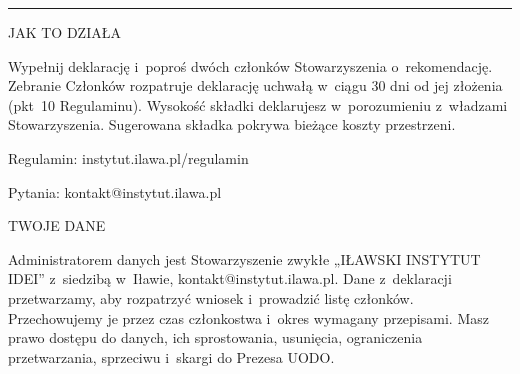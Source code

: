 \documentclass[11pt]{article}
\newcommand{\info}[1]{{\fontsize{8.5}{11}\selectfont\raggedright\color{tekstwyciszony}#1\par}}
\begin{document}
\begin{Form}
\vfill
{\color{linia}\rule{\linewidth}{0.5pt}}\par\vspace{2.5mm}
\begin{minipage}[t]{0.47\linewidth}
  {\ttfamily\footnotesize\color{lab}JAK TO DZIAŁA\par}\vspace{1mm}
  \info{Wypełnij deklarację i~poproś dwóch członków Stowarzyszenia
  o~rekomendację. Zebranie Członków rozpatruje deklarację uchwałą
  w~ciągu 30 dni od jej złożenia (pkt~10 Regulaminu). Wysokość
  składki deklarujesz w~porozumieniu z~władzami Stowarzyszenia.
  Sugerowana składka pokrywa bieżące koszty przestrzeni.\par\vspace{1.5mm}
  Regulamin: instytut.ilawa.pl/regulamin\par
  Pytania: kontakt@instytut.ilawa.pl}
\end{minipage}\hfill
\begin{minipage}[t]{0.47\linewidth}
  {\ttfamily\footnotesize\color{lab}TWOJE DANE\par}\vspace{1mm}
  \info{Administratorem danych jest Stowarzyszenie zwykłe „IŁAWSKI
  INSTYTUT IDEI” z~siedzibą w~Iławie, kontakt@instytut.ilawa.pl.
  Dane z~deklaracji przetwarzamy, aby rozpatrzyć wniosek i~prowadzić
  listę członków. Przechowujemy je przez czas członkostwa i~okres
  wymagany przepisami.
  Masz prawo dostępu do danych, ich sprostowania, usunięcia,
  ograniczenia przetwarzania, sprzeciwu i~skargi do Prezesa UODO.}
\end{minipage}

\end{Form}
\end{document}
